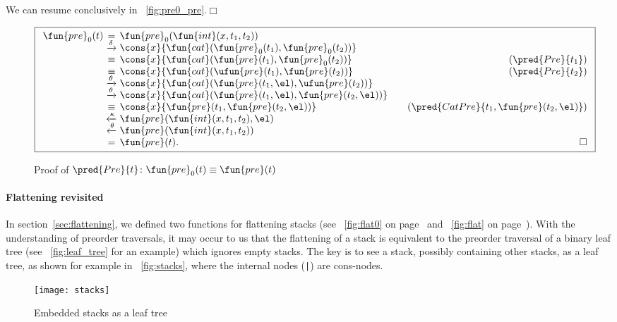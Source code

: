 We can resume conclusively in \fig~\vref{fig:pre0_pre}.\hfill\(\Box\)
\begin{figure}[]
\begin{equation*}
\boxed{%
\begin{array}{r@{\;}c@{\;}l@{\qquad}r}
\fun{pre}_0(t)
& = & \fun{pre}_0(\fun{int}(x,t_1,t_2))\\
& \xrightarrow{\smash{\delta}}
& \cons{x}{\fun{cat}(\fun{pre}_0(t_1), \fun{pre}_0(t_2))}\\
& \equiv & \cons{x}{\fun{cat}(\fun{pre}(t_1), \fun{pre}_0(t_2))}
& (\pred{Pre}{t_1})\\
& \equiv & \cons{x}{\fun{cat}(\ufun{pre}(t_1), \fun{pre}(t_2))}
& (\pred{Pre}{t_2})\\
& \xrightarrow{\smash{\theta}}
& \cons{x}{\fun{cat}(\fun{pre}(t_1,\el), \ufun{pre}(t_2))}\\
& \xrightarrow{\smash{\theta}}
& \cons{x}{\fun{cat}(\fun{pre}(t_1,\el), \fun{pre}(t_2,\el))}\\
& \equiv
& \cons{x}{\fun{pre}(t_1,\fun{pre}(t_2,\el))}
& (\pred{CatPre}{t_1,\fun{pre}(t_2,\el)})\\
& \xleftarrow{\smash{\kappa}}
& \fun{pre}(\fun{int}(x,t_1,t_2),\el)\\
& \xleftarrow{\smash{\theta}}
& \fun{pre}(\fun{int}(x,t_1,t_2))\\
& = & \fun{pre}(t). & \hfill\Box
\end{array}}
\end{equation*}
\caption{Proof of \(\pred{Pre}{t} \colon \fun{pre}_0(t) \equiv
  \fun{pre}(t)\)}
\label{fig:pre0_pre}
\end{figure}

\paragraph{Flattening revisited}

In section~\vref{sec:flattening}, we defined two functions for
flattening stacks (see \fig~\ref{fig:flat0} on
page~\pageref{fig:flat0} and \fig~\ref{fig:flat} on
page~\pageref{fig:flat}). With the understanding of preorder
traversals, it may occur to us that the flattening of a stack is
equivalent to the preorder traversal of a binary leaf
tree (see \fig~\vref{fig:leaf_tree} for
an example) which ignores empty stacks. The key is to see a stack,
possibly containing other stacks, as a leaf tree, as shown for example
in \fig~\vref{fig:stacks}, where the internal nodes (\texttt{|}) are
cons\hyp{}nodes.
\begin{figure}
\centering
\texttt{[image: stacks]}
\caption{Embedded stacks as a leaf tree}
\label{fig:stacks}
\end{figure}

